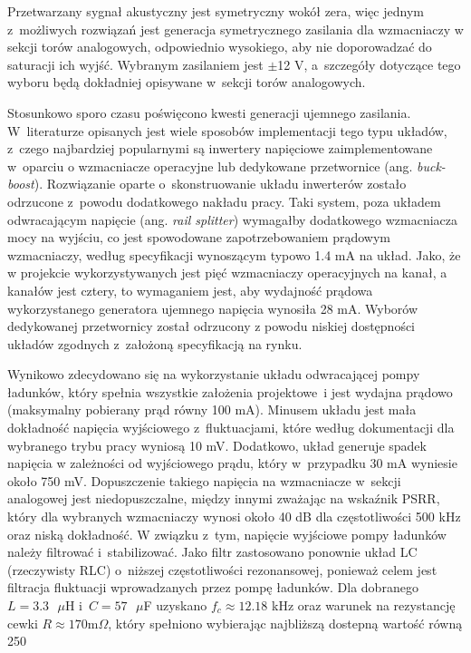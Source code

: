 Przetwarzany sygnał akustyczny jest symetryczny wokół zera, więc jednym
z~możliwych rozwiązań jest generacja symetrycznego zasilania dla wzmacniaczy w
sekcji torów analogowych, odpowiednio wysokiego, aby nie doporowadzać do
saturacji ich wyjść. Wybranym zasilaniem jest $\pm$12 V, a~szczegóły dotyczące
tego wyboru będą dokładniej opisywane w~sekcji torów analogowych. \par
Stosunkowo sporo czasu poświęcono kwesti generacji ujemnego zasilania.
W~literaturze \cite{bib:art} \cite{bib:tietze} opisanych jest wiele sposobów
implementacji tego typu układów, z~czego najbardziej popularnymi są inwertery
napięciowe zaimplementowane w~oparciu o wzmacniacze operacyjne lub dedykowane
przetwornice (ang. \textit{buck-boost}). Rozwiązanie oparte o~skonstruowanie
układu inwerterów zostało odrzucone z~powodu dodatkowego nakładu pracy. Taki
system, poza układem odwracającym napięcie (ang. \textit{rail splitter})
wymagałby dodatkowego wzmacniacza mocy na wyjściu, co jest spowodowane
zapotrzebowaniem prądowym wzmacniaczy, według specyfikacji wynoszącym typowo 1.4
mA na układ. Jako, że w projekcie wykorzystywanych jest pięć wzmacniaczy
operacyjnych na kanał, a kanałów jest cztery, to wymaganiem jest, aby wydajność
prądowa wykorzystanego generatora ujemnego napięcia wynosiła 28 mA. Wyborów
dedykowanej przetwornicy został odrzucony z powodu niskiej dostępności układów
zgodnych z~założoną specyfikacją na rynku. \par Wynikowo zdecydowano się na
wykorzystanie układu odwracającej pompy ładunków, który spełnia wszystkie
założenia projektowe~i jest wydajna prądowo (maksymalny pobierany prąd równy 100
mA). Minusem układu jest mała dokładność napięcia wyjściowego z~fluktuacjami,
które według dokumentacji \cite{bib:ltc3261} dla wybranego trybu pracy wyniosą
10 mV. Dodatkowo, układ generuje spadek napięcia w zależności od wyjściowego
prądu, który w~przypadku 30 mA wyniesie około 750 mV. Dopuszczenie takiego
napięcia na wzmacniacze w~sekcji analogowej jest niedopuszczalne, między innymi
zważając na wskaźnik PSRR, który dla wybranych wzmacniaczy wynosi około 40 dB
dla częstotliwości 500 kHz \cite{bib:tl071} oraz niską dokładność. W związku
z~tym, napięcie wyjściowe pompy ładunków należy filtrować i~stabilizować. Jako
filtr zastosowano ponownie układ LC (rzeczywisty RLC) o~niższej częstotliwości
rezonansowej, ponieważ celem jest filtracja fluktuacji wprowadzanych przez pompę
ładunków. Dla dobranego $L = 3.3 \text{ }\mu$H i~$C = 57 \text{ }\mu$F uzyskano
$f_c \approx 12.18$ kHz oraz warunek na rezystancję cewki $R \approx 170 \text{
m}\Omega$, który spełniono wybierając najbliższą dostepną wartość równą 250
